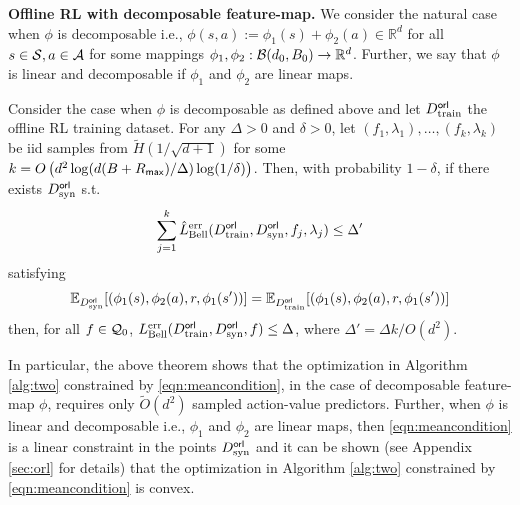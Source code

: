 {\bf Offline RL with decomposable feature-map.} We consider the natural case when $\phi$ is decomposable i.e., $\phi(s,a) := \phi_1(s) + \phi_2(a) \in \mathbb{R}^d$ for all $s \in \mathcal{S}, a\in \mathcal{A}$ for some mappings $\phi_1, \phi_2 : \mathcal{B}(d_0, B_0)\to \mathbb{R}^d$. Further, we say that $\phi$ is linear and decomposable if $\phi_1$ and $\phi_2$ are linear maps. 


\begin{theorem}\label{thm:offline-rl-decomposable}
 Consider the case when $\phi$ is decomposable as defined above and let $D^{\sf orl}_{\textnormal{train}}$ the offline RL training dataset. For any $\Delta > 0$ and $\delta > 0$, let $(f_1, \lambda_1), \dots, (f_k, \lambda_k)$  be iid samples from  $\tilde{H}(1/\sqrt{d+1})$ for some $k =O\left({d^2}\log({d}(B+R_{\sf max})/{\Delta})\log(1/\delta)\right)$. Then, with probability $1-\delta$, if there exists $D^{\sf orl}_{\textnormal{syn}}$ s.t. 
\begin{equation}
    \sum_{j = 1}^{k} \hat{L}^{\textnormal{err}}_{\textnormal{Bell}}(D^{\sf orl}_{\textnormal{train}}, D^{\sf orl}_{\textnormal{syn}}, f_j, \lambda_j) \leq \Delta' 
\end{equation}
satisfying
\begin{equation}\label{eqn:meancondition}
   \mathbb{E}_{D^{\sf orl}_{\textnormal{syn}}} [(\phi_1(s), \phi_2(a), r, \phi_1(s'))] = \mathbb{E}_{ D^{\sf orl}_{\textnormal{train}}} [(\phi_1(s), \phi_2(a), r, \phi_1(s'))] 
   \end{equation}
then, for all $f \in \mathcal{Q}_0$, $L^{\textnormal{err}}_{\textnormal{Bell}}(D^{\sf orl}_{\textnormal{train}}, D^{\sf orl}_{\textnormal{syn}}, f) \leq \Delta$, where $\Delta' = \Delta k/O(d^2)$. 
\end{theorem}
In particular, the above theorem shows that the optimization in Algorithm \ref{alg:two} constrained by \eqref{eqn:meancondition}, in the case of decomposable feature-map $\phi$, requires only $\tilde{O}(d^2)$ sampled action-value predictors. Further, when $\phi$ is linear and decomposable i.e., $\phi_1$ and $\phi_2$ are linear maps, then \eqref{eqn:meancondition} is a linear constraint in the points $D^{\sf orl}_{\textnormal{syn}}$  and it can be shown (see Appendix \ref{sec:orl} for details) that the optimization in Algorithm \ref{alg:two} constrained by \eqref{eqn:meancondition} is convex.



